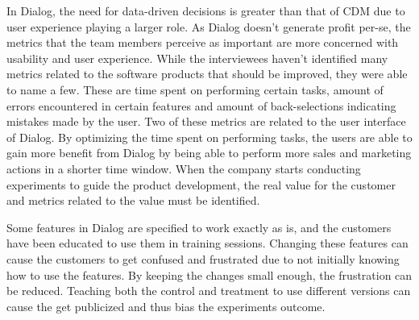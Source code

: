 \documentclass[english, grading]{tktltiki2}
\theoremstyle{definition}
\theoremstyle{remark}
\begin{document}
In Dialog, the need for data-driven decisions is greater than that of CDM due to user experience playing a larger role. As Dialog doesn't generate profit per-se, the metrics that the team members perceive as important are more concerned with usability and user experience. While the interviewees haven't identified many metrics related to the software products that should be improved, they were able to name a few. These are time spent on performing certain tasks, amount of errors encountered in certain features and amount of back-selections indicating mistakes made by the user. Two of these metrics are related to the user interface of Dialog. By optimizing the time spent on performing tasks, the users are able to gain more benefit from Dialog by being able to perform more sales and marketing actions in a shorter time window. When the company starts conducting experiments to guide the product development, the real value for the customer and metrics related to the value must be identified.

Some features in Dialog are specified to work exactly as is, and the customers have been educated to use them in training sessions. Changing these features can cause the customers to get confused and frustrated due to not initially knowing how to use the features. By keeping the changes small enough, the frustration can be reduced. Teaching both the control and treatment to use different versions can cause the get publicized and thus bias the experiments outcome.   






\end{document}
